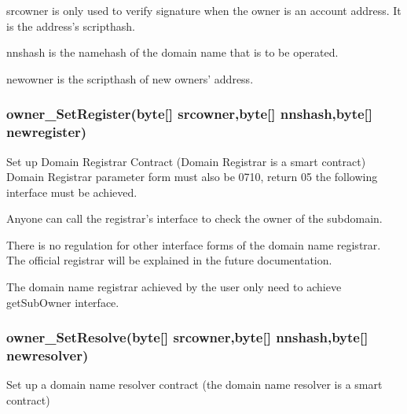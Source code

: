 \documentclass[letterpaper,10pt,english]{sphinxmanual}
\begin{document}
srcowner is only used to verify signature when the owner is an account address. It is the address’s scripthash.

nnshash is the namehash of the domain name that is to be operated.

newowner is the scripthash of new owners’ address.


\subsubsection{owner\_SetRegister(byte{[}{]} srcowner,byte{[}{]} nnshash,byte{[}{]} newregister)}
\label{\detokenize{nns_protocol:owner-setregister-byte-srcowner-byte-nnshash-byte-newregister}}
Set up Domain Registrar Contract (Domain Registrar is a smart contract) Domain Registrar parameter form must also be 0710, return 05
the following interface must be achieved.

%
\begin{sphinxVerbatim}[commandchars=\\\{\}]
     \PYG{p}{[}\PYG{p}{]} 
       
         \PYG{p}{[}\PYG{p}{]}\PYG{p}{[}\PYG{p}{]} \PYG{p}{[}\PYG{p}{]}

    \PYG{p}{[}\PYG{p}{]}  
\end{sphinxVerbatim}

Anyone can call the registrar’s interface to check the owner of the subdomain.

There is no regulation for other interface forms of the domain name registrar. The official registrar will be explained in the future documentation.

The domain name registrar achieved by the user only need to achieve getSubOwner interface.


\subsubsection{owner\_SetResolve(byte{[}{]} srcowner,byte{[}{]} nnshash,byte{[}{]} newresolver)}
\label{\detokenize{nns_protocol:owner-setresolve-byte-srcowner-byte-nnshash-byte-newresolver}}
Set up a domain name resolver contract (the domain name resolver is a smart contract)
\end{document}
